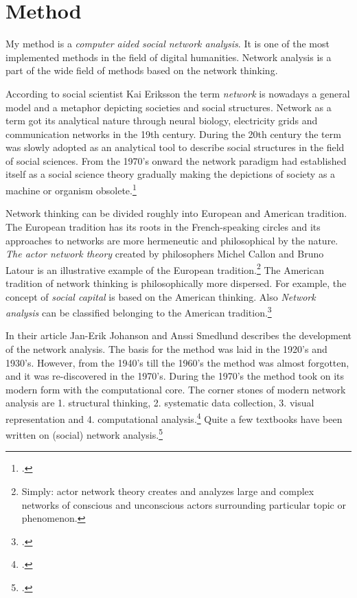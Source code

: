 \section{Method}
\label{method}
My method is a \textit{computer aided social network analysis}. It is one of the most implemented methods in the field of digital humanities. Network analysis is a part of the wide field of methods based on the network thinking.

According to social scientist Kai Eriksson the term \textit{network} is nowadays a general model and a metaphor depicting societies and social structures. Network as a term got its analytical nature through neural biology, electricity grids and communication networks in the 19th century. During the 20th century the term was slowly adopted as an analytical tool to describe social structures in the field of social sciences. From the 1970's onward the network paradigm had established itself as a social science theory gradually making the depictions of society as a machine or organism obsolete.\footcite[pp. 7-19.]{eriksson15}
 
Network thinking can be divided roughly into European and American tradition. The European tradition has its roots in the French-speaking circles and its approaches to networks are more hermeneutic and philosophical by the nature. \textit{The actor network theory} created by philosophers Michel Callon and Bruno Latour is an illustrative example of the European tradition.\footnote{Simply: actor network theory creates and analyzes large and complex networks of conscious and unconscious actors surrounding particular topic or phenomenon.} The American tradition of network thinking is philosophically more dispersed. For example, the concept of \textit{social capital} is based on the American thinking. Also \textit{Network analysis} can be classified belonging to the American tradition.\footcite[pp. 22-24.]{eriksson15}

In their article Jan-Erik Johanson and Anssi Smedlund describes the development of the network analysis. The basis for the method was laid in the 1920's and 1930's. However, from the 1940's till the 1960's the method was almost forgotten, and it was re-discovered in the 1970's. During the 1970's the method took on its modern form with the computational core. The corner stones of modern network analysis are 1. structural thinking, 2. systematic data collection, 3. visual representation and 4. computational analysis.\footcite[pp. 236-242.]{johansonAndSmedlund15} Quite a few textbooks have been written on (social) network analysis.\footcites[See e. g. ][or Krishna Raj P. M., Ankith Mohan and K. G. Srinivasa \textit{Practical Social Network Analysis with Python} or Xiaoming Fu et al. \textit{Social Network Analysis: Interdisciplinary Approaches and Case Studies}.]{huhtamakiEtAl}

